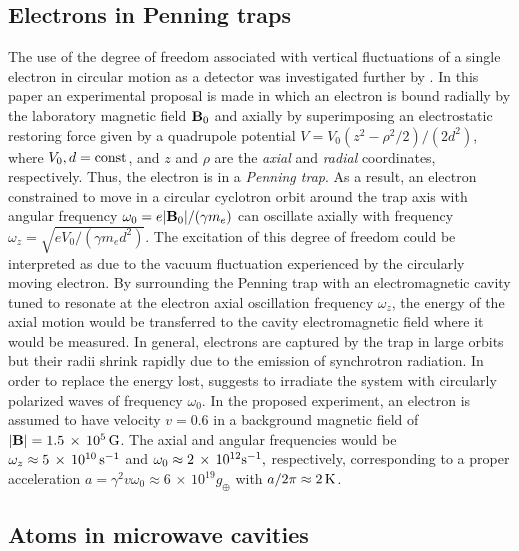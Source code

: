 \documentclass[12pt,nofootinbib,floatfix,aps,prd,showpacs,amsmath,amssymb,eqsecnum]{revtex4-2}
\begin{document}
\subsection{Electrons in Penning traps}
\label{subsection:penningtrap}

The use of the degree of freedom associated with vertical fluctuations 
of a single electron in circular motion as a detector was investigated 
further by \textcite{Rogers88}. In this paper an experimental proposal
is made in which an electron
is bound radially by the laboratory magnetic field ${\bf B}_0$ 
and axially by superimposing an electrostatic restoring force given 
by a quadrupole  potential 
\cite{Brownetal86}
$ 
V = V_0 {(z^2 - \rho^2/2)}/(2 d^2)
$,
where $V_0, d = {\rm const}$, and  $z$ and $\rho$ are the {\em axial} and
{\em radial} coordinates, respectively. Thus, the electron is in a
{\em Penning trap}. As a result, an electron constrained 
to move in a circular cyclotron orbit around the trap axis with angular 
frequency $\omega_0 = e|{\bf B}_0| / (\gamma m_e)$ can oscillate axially 
with frequency
$
\omega_z = \sqrt{e V_0/ ( \gamma m_e d^2)}
$.
The excitation of this degree of freedom could be interpreted as due to 
the vacuum fluctuation experienced by the circularly moving electron. By
surrounding the Penning trap with an electromagnetic cavity tuned to 
resonate at the electron axial oscillation frequency $\omega_z$, the 
energy of the axial motion would be transferred to the cavity 
electromagnetic field where it would be measured.
In general, electrons are captured by the trap in large orbits but their 
radii shrink rapidly due to 
the emission of synchrotron radiation. In order
to replace the energy lost, \textcite{Rogers88} suggests to
irradiate the system with circularly polarized waves of frequency 
$\omega_0$. In the proposed experiment,
an electron is assumed to have 
velocity $v=0.6$ in a background magnetic field of 
$|{\bf B}| = 1.5\, \times \, 10^{5} \,  {\rm G}$. The axial and angular 
frequencies would be 
$
\omega_z \approx 5 \, \times \, 10^{10} \, {\rm s}^{-1}
$
and
$
\omega_0 \approx 2 \, \times \, 10^{12} {\rm s}^{-1},
$
respectively, corresponding to a proper acceleration 
$a = \gamma^2 v \omega_0 \approx 6 \, \times \, 10^{19} g_\oplus$
with $a/2\pi \approx 2\,{\rm K}$.

\subsection{Atoms in microwave cavities}
\label{subsection:cavities}
\end{document}
